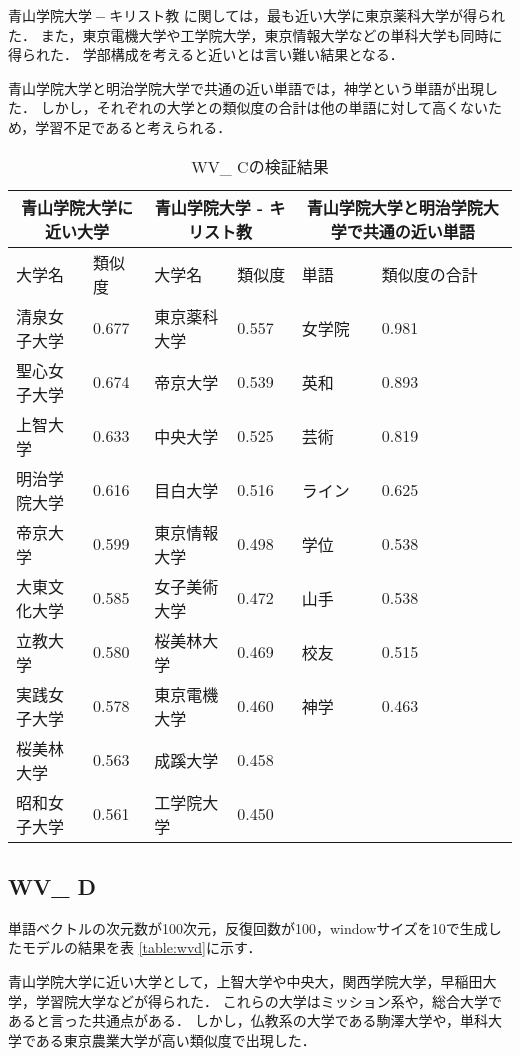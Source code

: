 $ 青山学院大学 - キリスト教 $ に関しては，最も近い大学に東京薬科大学が得られた．
また，東京電機大学や工学院大学，東京情報大学などの単科大学も同時に得られた．
学部構成を考えると近いとは言い難い結果となる．

青山学院大学と明治学院大学で共通の近い単語では，神学という単語が出現した．
しかし，それぞれの大学との類似度の合計は他の単語に対して高くないため，学習不足であると考えられる．

\begin{table}[H]
\caption{WV\_ Cの検証結果}
\centering
\footnotesize
\begin{tabular}{ll|ll|ll}
\hline
\multicolumn{2}{c}{青山学院大学に近い大学} & \multicolumn{2}{c}{青山学院大学 - キリスト教} & \multicolumn{2}{c}{青山学院大学と明治学院大学で共通の近い単語}
\\ \hline
大学名 & 類似度 & 大学名 & 類似度 & 単語 & 類似度の合計
\\ \hline \hline
清泉女子大学 & 0.677 & 東京薬科大学 & 0.557 & 女学院 & 0.981\\
聖心女子大学 & 0.674 & 帝京大学 & 0.539 & 英和 & 0.893\\
上智大学 & 0.633 & 中央大学 & 0.525 & 芸術 & 0.819\\
明治学院大学 & 0.616 & 目白大学 & 0.516 & ライン & 0.625\\
帝京大学 & 0.599 & 東京情報大学 & 0.498 & 学位 & 0.538\\
大東文化大学 & 0.585 & 女子美術大学 & 0.472 & 山手 & 0.538\\
立教大学 & 0.580 & 桜美林大学 & 0.469 & 校友 & 0.515\\
実践女子大学 & 0.578 & 東京電機大学 & 0.460 & 神学 & 0.463\\
桜美林大学 & 0.563 & 成蹊大学 & 0.458 & & \\
昭和女子大学 & 0.561 & 工学院大学 & 0.450 & & \\ \hline
\end{tabular}
\label{table:wvc}
\end{table}


\subsection{WV\_ D}
単語ベクトルの次元数が100次元，反復回数が100，windowサイズを10で生成したモデルの結果を表 \ref{table:wvd}に示す．

青山学院大学に近い大学として，上智大学や中央大，関西学院大学，早稲田大学，学習院大学などが得られた．
これらの大学はミッション系や，総合大学であると言った共通点がある．
しかし，仏教系の大学である駒澤大学や，単科大学である東京農業大学が高い類似度で出現した．

